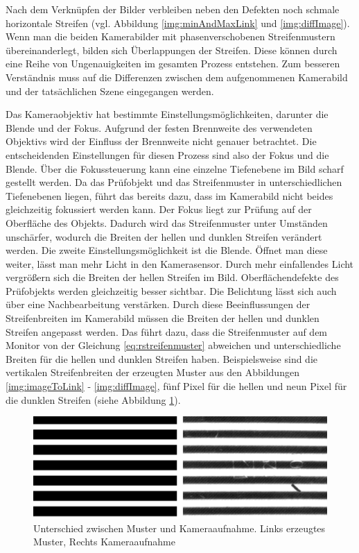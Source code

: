 Nach dem Verknüpfen der Bilder verbleiben neben den Defekten noch schmale horizontale Streifen (vgl. Abbildung \ref{img:minAndMaxLink} und \ref{img:diffImage}).
Wenn man die beiden Kamerabilder mit phasenverschobenen Streifenmustern übereinanderlegt, bilden sich Überlappungen der Streifen.
Diese können durch eine Reihe von Ungenauigkeiten im gesamten Prozess entstehen.
Zum besseren Verständnis muss auf die Differenzen zwischen dem aufgenommenen Kamerabild und der tatsächlichen Szene eingegangen werden.

\p
Das Kameraobjektiv hat bestimmte Einstellungsmöglichkeiten, darunter die Blende und der Fokus.
Aufgrund der festen Brennweite des verwendeten Objektivs wird der Einfluss der Brennweite nicht genauer betrachtet.
Die entscheidenden Einstellungen für diesen Prozess sind also der Fokus und die Blende.
Über die Fokussteuerung kann eine einzelne Tiefenebene im Bild scharf gestellt werden.
Da das Prüfobjekt und das Streifenmuster in unterschiedlichen Tiefenebenen liegen, führt das bereits dazu, dass im Kamerabild nicht beides gleichzeitig fokussiert werden kann.
Der Fokus liegt zur Prüfung auf der Oberfläche des Objekts.
Dadurch wird das Streifenmuster unter Umständen unschärfer, wodurch die Breiten der hellen und dunklen Streifen verändert werden.
Die zweite Einstellungsmöglichkeit ist die Blende.
Öffnet man diese weiter, lässt man mehr Licht in den Kamerasensor.
Durch mehr einfallendes Licht vergrößern sich die Breiten der hellen Streifen im Bild. 
Oberflächendefekte des Prüfobjekts werden gleichzeitig besser sichtbar.
Die Belichtung lässt sich auch über eine Nachbearbeitung verstärken.
Durch diese Beeinflussungen der Streifenbreiten im Kamerabild müssen die Breiten der hellen und dunklen Streifen angepasst werden.
Das führt dazu, dass die Streifenmuster auf dem Monitor von der Gleichung \ref{eq:rstreifenmuster} abweichen und unterschiedliche Breiten für die hellen und dunklen Streifen haben.
Beispielsweise sind die vertikalen Streifenbreiten der erzeugten Muster aus den Abbildungen \ref{img:imageToLink} - \ref{img:diffImage}, fünf Pixel für die hellen und neun Pixel für die dunklen Streifen (siehe Abbildung \ref{img:differenceCamPat}).

\begin{figure}[H]
	\centering
	\includegraphics[width=\textwidth]{03_sichtpruefungDurchLichtstreuung/optimierungen/figures/differenceCameraPattern}
	\caption[Unterschied zwischen Muster und Kameraaufnahme]{Unterschied zwischen Muster und Kameraaufnahme. Links erzeugtes Muster, Rechts Kameraaufnahme}
	\label{img:differenceCamPat}
\end{figure}

